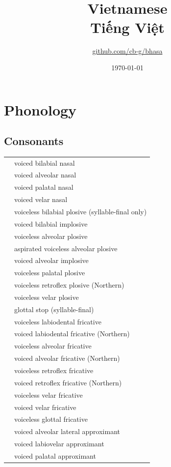 \documentclass{article}
\title{Vietnamese\\{\vietnamesefont Tiếng Việt}\\\ipa{[ti@N vi@\super{P}t]}}
\author{\href{https://github.com/cb-g/bhasa}{github.com/cb-g/bhasa}}
\date{\today}
\begin{document}
\pagecolor{custom_bg}\color{custom_fg}
\maketitle\thispagestyle{empty}

\newpage\setcounter{page}{1}\section{Phonology}

\subsection{Consonants}

\begin{xltabular}{\textwidth}{lL}
   & voiced bilabial nasal \\
   & voiced alveolar nasal \\
  \ipa{\textltailn} & voiced palatal nasal \\
   & voiced velar nasal \\
   & voiceless bilabial plosive (syllable-final only) \\
   & voiced bilabial implosive \\
   & voiceless alveolar plosive \\
   & aspirated voiceless alveolar plosive \\
   & voiced alveolar implosive \\
   & voiceless palatal plosive \\
   & voiceless retroflex plosive (Northern) \\
   & voiceless velar plosive \\
   & glottal stop (syllable-final) \\
   & voiceless labiodental fricative \\
   & voiced labiodental fricative (Northern) \\
   & voiceless alveolar fricative \\
   & voiced alveolar fricative (Northern) \\
   & voiceless retroflex fricative \\
   & voiced retroflex fricative (Northern) \\
   & voiceless velar fricative \\
   & voiced velar fricative \\
   & voiceless glottal fricative \\
   & voiced alveolar lateral approximant \\
   & voiced labiovelar approximant \\
   & voiced palatal approximant \\
\end{xltabular}
\end{document}
